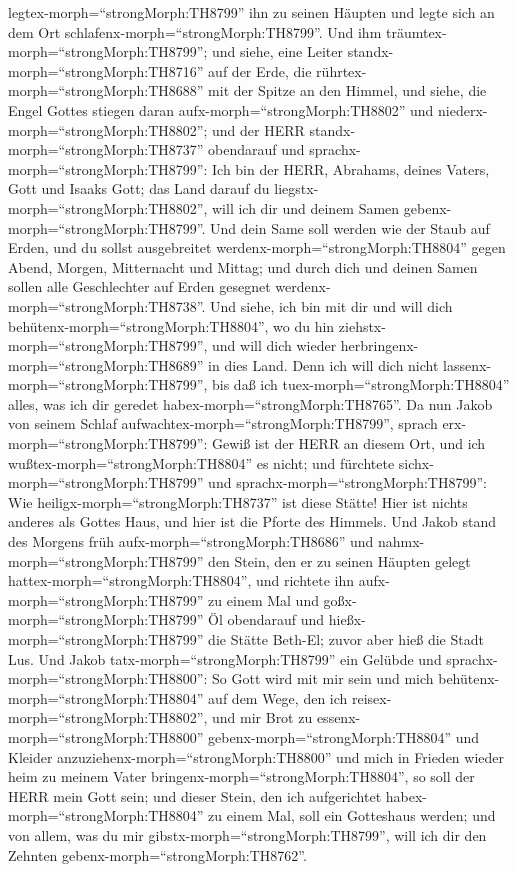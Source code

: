 legtex-morph=``strongMorph:TH8799'' ihn zu seinen Häupten und legte sich
an dem Ort schlafenx-morph=``strongMorph:TH8799''.  Und ihm
träumtex-morph=``strongMorph:TH8799''; und siehe, eine Leiter
standx-morph=``strongMorph:TH8716'' auf der Erde, die
rührtex-morph=``strongMorph:TH8688'' mit der Spitze an den Himmel, und
siehe, die Engel Gottes stiegen daran aufx-morph=``strongMorph:TH8802''
und niederx-morph=``strongMorph:TH8802'';  und der HERR
standx-morph=``strongMorph:TH8737'' obendarauf und
sprachx-morph=``strongMorph:TH8799'': Ich bin der HERR, Abrahams, deines
Vaters, Gott und Isaaks Gott; das Land darauf du
liegstx-morph=``strongMorph:TH8802'', will ich dir und deinem Samen
gebenx-morph=``strongMorph:TH8799''.  Und dein Same soll
werden wie der Staub auf Erden, und du sollst ausgebreitet
werdenx-morph=``strongMorph:TH8804'' gegen Abend, Morgen, Mitternacht
und Mittag; und durch dich und deinen Samen sollen alle Geschlechter auf
Erden gesegnet werdenx-morph=``strongMorph:TH8738''.  Und
siehe, ich bin mit dir und will dich
behütenx-morph=``strongMorph:TH8804'', wo du hin
ziehstx-morph=``strongMorph:TH8799'', und will dich wieder
herbringenx-morph=``strongMorph:TH8689'' in dies Land. Denn ich will
dich nicht lassenx-morph=``strongMorph:TH8799'', bis daß ich
tuex-morph=``strongMorph:TH8804'' alles, was ich dir geredet
habex-morph=``strongMorph:TH8765''.  Da nun Jakob von
seinem Schlaf aufwachtex-morph=``strongMorph:TH8799'', sprach
erx-morph=``strongMorph:TH8799'': Gewiß ist der HERR an diesem Ort, und
ich wußtex-morph=``strongMorph:TH8804'' es nicht;  und
fürchtete sichx-morph=``strongMorph:TH8799'' und
sprachx-morph=``strongMorph:TH8799'': Wie
heiligx-morph=``strongMorph:TH8737'' ist diese Stätte! Hier ist nichts
anderes als Gottes Haus, und hier ist die Pforte des Himmels.
 Und Jakob stand des Morgens früh
aufx-morph=``strongMorph:TH8686'' und nahmx-morph=``strongMorph:TH8799''
den Stein, den er zu seinen Häupten gelegt
hattex-morph=``strongMorph:TH8804'', und richtete ihn
aufx-morph=``strongMorph:TH8799'' zu einem Mal und
goßx-morph=``strongMorph:TH8799'' Öl obendarauf  und
hießx-morph=``strongMorph:TH8799'' die Stätte Beth-El; zuvor aber hieß
die Stadt Lus.  Und Jakob tatx-morph=``strongMorph:TH8799''
ein Gelübde und sprachx-morph=``strongMorph:TH8800'': So Gott wird mit
mir sein und mich behütenx-morph=``strongMorph:TH8804'' auf dem Wege,
den ich reisex-morph=``strongMorph:TH8802'', und mir Brot zu
essenx-morph=``strongMorph:TH8800'' gebenx-morph=``strongMorph:TH8804''
und Kleider anzuziehenx-morph=``strongMorph:TH8800''  und
mich in Frieden wieder heim zu meinem Vater
bringenx-morph=``strongMorph:TH8804'', so soll der HERR mein Gott sein;
 und dieser Stein, den ich aufgerichtet
habex-morph=``strongMorph:TH8804'' zu einem Mal, soll ein Gotteshaus
werden; und von allem, was du mir gibstx-morph=``strongMorph:TH8799'',
will ich dir den Zehnten gebenx-morph=``strongMorph:TH8762''.

